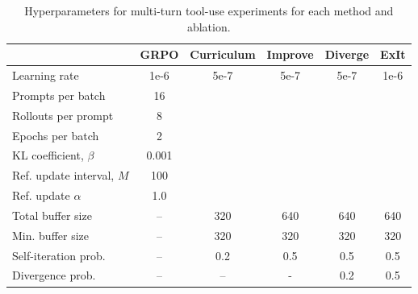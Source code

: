 \begin{table}[htb]
\footnotesize
\centering
\begin{tabular}{l|ccccc}
\toprule
 & \textbf{GRPO} & \textbf{Curriculum} & \textbf{Improve} & \textbf{Diverge} & \textbf{ExIt} \\
\midrule
Learning rate       & 1e-6 & 5e-7 & 5e-7 & 5e-7 & 1e-6 \\
Prompts per batch  & 16 &  &  &  &  \\
Rollouts per prompt  & 8  &  &  &  &   \\
Epochs per batch     & 2 & & & & \\
KL coefficient, $\beta$ & 0.001 & & & & \\
Ref. update interval, $M$ & 100 & & & & \\
Ref. update $\alpha$  & 1.0 & & & & \\
Total buffer size   & – & 320 & 640 & 640 & 640 \\
Min. buffer size    & – & 320 & 320 & 320 & 320 \\
Self-iteration prob. & – & 0.2 & 0.5 & 0.5 & 0.5 \\
Divergence prob.     & – & – & - & 0.2 & 0.5 \\
\bottomrule
\end{tabular}
\caption{Hyperparameters for multi-turn tool-use experiments for each method and ablation.}
\label{tab:hyperparams_bfcl}
\end{table}


